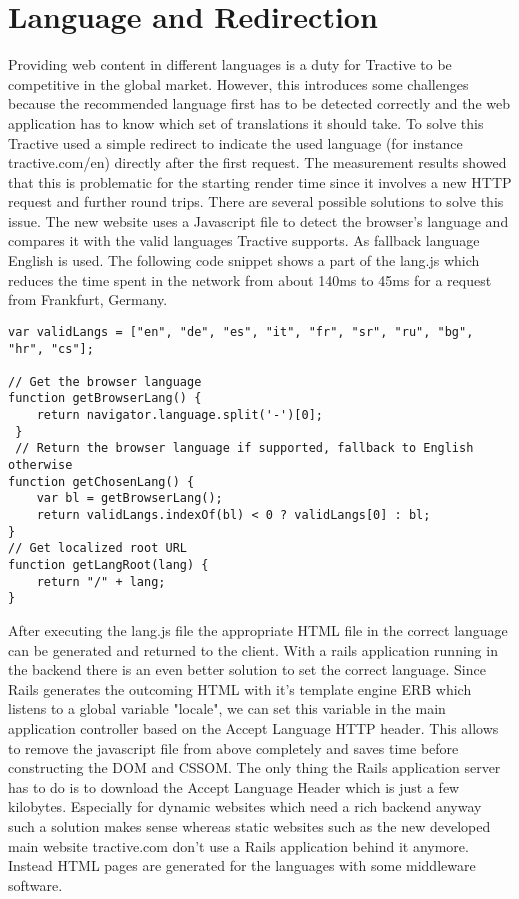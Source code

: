 \section{Language and Redirection}

Providing web content in different languages is a duty for Tractive to be competitive in the global market. However, this introduces some challenges because the recommended language first has to be detected correctly and the web application has to know which set of translations it should take. To solve this Tractive used a simple redirect to indicate the used language (for instance tractive.com/en) directly after the first request. The measurement results showed that this is problematic for the starting render time since it involves a new HTTP request and further round trips. There are several possible solutions to solve this issue. The new website uses a Javascript file to detect the browser's language and compares it with the valid languages Tractive supports. As fallback language English is used. The following code snippet shows a part of the lang.js which reduces the time spent in the network from about 140ms to 45ms for a request from Frankfurt, Germany.

\begin{lstlisting}[caption=Code snippet of lang.js]
var validLangs = ["en", "de", "es", "it", "fr", "sr", "ru", "bg", "hr", "cs"];

// Get the browser language
function getBrowserLang() {
    return navigator.language.split('-')[0];
 }
 // Return the browser language if supported, fallback to English otherwise
function getChosenLang() {
    var bl = getBrowserLang();
    return validLangs.indexOf(bl) < 0 ? validLangs[0] : bl;
}
// Get localized root URL
function getLangRoot(lang) {
    return "/" + lang;
}
\end{lstlisting} 

After executing the lang.js file the appropriate HTML file in the correct language can be generated and returned to the client. With a rails application running in the backend there is an even better solution to set the correct language. Since Rails generates the outcoming HTML with it's template engine ERB which listens to a global variable "locale", we can set this variable in the main application controller based on the Accept Language HTTP header. This allows to remove the javascript file from above completely and saves time before constructing the DOM and CSSOM. The only thing the Rails application server has to do is to download the Accept Language Header which is just a few kilobytes. Especially for dynamic websites which need a rich backend anyway such a solution makes sense whereas static websites such as the new developed main website tractive.com don't use a Rails application behind it anymore. Instead HTML pages are generated for the languages with some middleware software.
